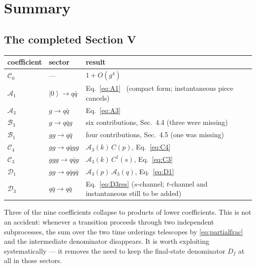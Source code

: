 \documentclass[11pt]{article}
\newcommand{\dg}{\dagger}
\newcommand{\ket}[1]{\left|#1\right\rangle}
\newcommand{\vac}{\ket{0}}
\begin{document}
\section{Summary}

\subsection{The completed Section V}

\begin{center}
\renewcommand{\arraystretch}{1.35}
\begin{tabular}{lll}
\hline
coefficient & sector & result\\
\hline
$\mathcal C_{0}$ & --- & $1+O(g^{4})$\\
$\mathcal A_{1}$ & $\vac\to q\bar q$ & Eq.~\eqref{eq:A1} \ (compact form; instantaneous piece cancels)\\
$\mathcal A_{3}$ & $g\to q\bar q$ & Eq.~\eqref{eq:A3}\\
$\mathcal B_{3}$ & $g\to q\bar q g$ & six contributions, Sec.~4.4 (three were missing)\\
$\mathcal B_{1}$ & $gg\to q\bar q$ & four contributions, Sec.~4.5 (one was missing)\\
$\mathcal C_{4}$ & $gg\to q\bar q gg$ & $\mathcal A_{3}(k)\,C(p)$, Eq.~\eqref{eq:C4}\\
$\mathcal C_{3}$ & $ggg\to q\bar q g$ & $\mathcal A_{3}(k)\,C^{\dg}(s)$, Eq.~\eqref{eq:C3}\\
$\mathcal D_{1}$ & $gg\to q\bar q q\bar q$ & $\mathcal A_{3}(p)\,\mathcal A_{3}(q)$, Eq.~\eqref{eq:D1}\\
$\mathcal D_{3}$ & $q\bar q\to q\bar q$ & Eq.~\eqref{eq:D3res} ($s$-channel; $t$-channel and
instantaneous still to be added)\\
\hline
\end{tabular}
\end{center}

\noindent
Three of the nine coefficients collapse to products of lower coefficients. This is not an
accident: whenever a transition proceeds through two independent subprocesses, the sum over the
two time orderings telescopes by \eqref{eq:partialfrac} and the intermediate denominator
disappears. It is worth exploiting systematically --- it removes the need to keep the
final-state denominator $D_f$ at all in those sectors.
\end{document}
